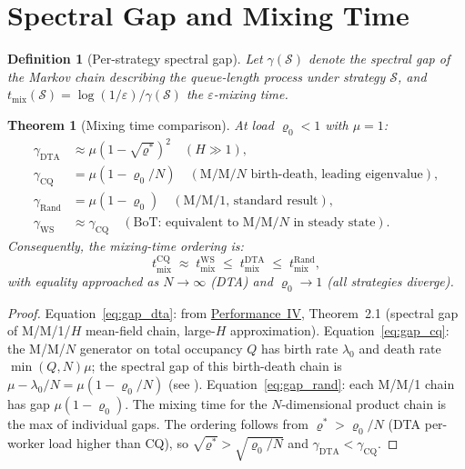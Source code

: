 \documentclass[11pt,a4paper]{report}
\newtheorem{theorem}{Theorem}[section]
\newtheorem{definition}{Definition}[section]
\begin{document}
\section{Spectral Gap and Mixing Time}

\begin{definition}[Per-strategy spectral gap]
Let $\gamma(\mathcal{S})$ denote the spectral gap of the Markov chain
describing the queue-length process under strategy $\mathcal{S}$,
and $t_{\mathrm{mix}}(\mathcal{S}) = \log(1/\varepsilon)/\gamma(\mathcal{S})$
the $\varepsilon$-mixing time.
\end{definition}

\begin{theorem}[Mixing time comparison]\label{thm:mixing_compare}
At load $\varrho_0 < 1$ with $\mu = 1$:
\begin{align}
  \gamma_{\mathrm{DTA}} &\approx \mu(1 - \sqrt{\varrho^*})^2
     \quad(H \gg 1), \label{eq:gap_dta}\\
  \gamma_{\mathrm{CQ}} &= \mu(1 - \varrho_0/N)
     \quad(\text{M/M/}N \text{ birth-death, leading eigenvalue}), \label{eq:gap_cq}\\
  \gamma_{\mathrm{Rand}} &= \mu(1 - \varrho_0)
     \quad(\text{M/M/1, standard result}), \label{eq:gap_rand}\\
  \gamma_{\mathrm{WS}} &\approx \gamma_{\mathrm{CQ}}
     \quad(\text{BoT: equivalent to M/M/}N \text{ in steady state}). \label{eq:gap_ws}
\end{align}
Consequently, the mixing-time ordering is:
\[
  t_{\mathrm{mix}}^{\mathrm{CQ}} \;\approx\; t_{\mathrm{mix}}^{\mathrm{WS}}
  \;\le\; t_{\mathrm{mix}}^{\mathrm{DTA}}
  \;\le\; t_{\mathrm{mix}}^{\mathrm{Rand}},
\]
with equality approached as $N \to \infty$ (DTA) and $\varrho_0 \to 1$ (all strategies diverge).
\end{theorem}

\begin{proof}
Equation~\eqref{eq:gap_dta}: from \hyperref[chap:stability]{Performance~IV}, Theorem~2.1 (spectral
gap of M/M/1/$H$ mean-field chain, large-$H$ approximation).
Equation~\eqref{eq:gap_cq}: the M/M/$N$ generator on total occupancy $Q$
has birth rate $\lambda_0$ and death rate $\min(Q,N)\mu$; the spectral gap
of this birth-death chain is $\mu - \lambda_0/N = \mu(1-\varrho_0/N)$
(see \cite{fill1991}).
Equation~\eqref{eq:gap_rand}: each M/M/1 chain has gap $\mu(1-\varrho_0)$.
The mixing time for the $N$-dimensional product chain is the max of individual gaps.
The ordering follows from $\varrho^* > \varrho_0/N$ (DTA per-worker load higher
than CQ), so $\sqrt{\varrho^*} > \sqrt{\varrho_0/N}$ and $\gamma_{\mathrm{DTA}} < \gamma_{\mathrm{CQ}}$.
\end{proof}
\end{document}
